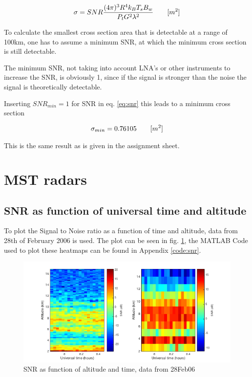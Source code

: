 \begin{equation}
\label{eq:snr}
	\centering
	\sigma = {SNR} \frac{(4 \pi)^3 R^4 k_B T_s B_w}{P_t G^2 \lambda^2}	\qquad [m^2]
\end{equation}

To calculate the smallest cross section area that is detectable at a range of 100km, one has to assume a minimum SNR, at which the minimum cross section is still detectable.

The minimum SNR, not taking into account LNA's or other instruments to increase the SNR, is obviously 1, since if the signal is stronger than the noise the signal is theoretically detectable.

Inserting $SNR_{min} = 1$ for SNR in eq. \ref{eq:snr} this leads to a minimum cross section

\begin{equation}
\label{eq:crossSecResult}
	\centering
	\sigma_{min} = 0.76105 \qquad [m^2]	
\end{equation}

This is the same result as is given in the assignment sheet.


\section{MST radars}

\subsection{SNR as function of universal time and altitude}
To plot the Signal to Noise ratio as a function of time and altitude, data from 28th of February 2006 is used. The plot can be seen in fig. \ref{img:snrPlot}, the MATLAB Code used to plot these heatmaps can be found in Appendix \ref{code:snr}.

\begin{figure}
	\centering
	\label{img:snrPlot}
	\includegraphics[width=\textwidth]{images/task4_plot1}
	\caption{SNR as function of altitude and time, data from 28Feb06}
\end{figure}


